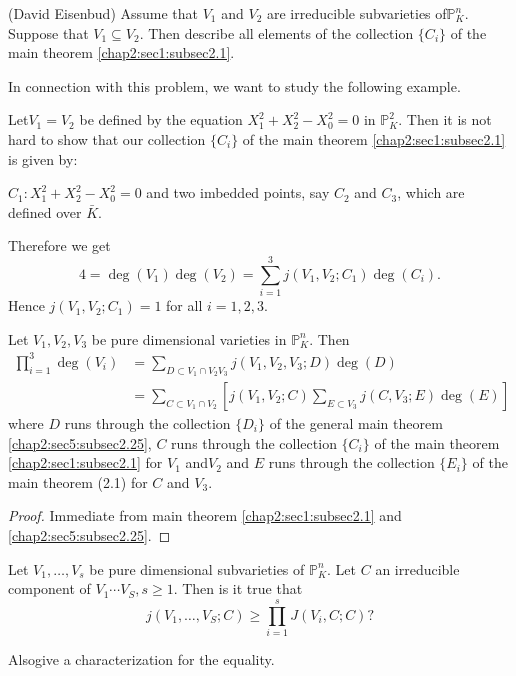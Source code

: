 \begin{numproblem}[9](David Eisenbud)\label{chap3:sec3:prob3.44}
  Assume that $V_1$ and $V_2$ are irreducible subvarieties
  of$\mathbb{P}_K^n$. Suppose that $V_1 \subseteq V_2$. Then describe
  all elements of the collection $\{ C_i\} $ of the main theorem
  \ref{chap2:sec1:subsec2.1}. 
\end{numproblem}

In connection with this problem, we want to study the following
example. 

\setcounter{example}{44}
\begin{example}\label{chap3:sec3:exp3.45}
  Let\pageoriginale $V_1=V_2$ be defined by the equation $X_1^2 +
  X_2^2-X_0^2 =0$ in 
  $\mathbb{P}_K^2 $. Then it is not hard to show that our collection
  $\{ C_i\}$ of the main theorem \ref{chap2:sec1:subsec2.1} is given by: 

  $C_1: X_1^2 +X_2^2 - X_0^2 =0$ and two imbedded points, say $C_2$
  and $C_3$, which are  defined over $\bar{K}$. 
\end{example}

Therefore we get
$$
4= \deg (V_1) \deg (V_2) = \sum \limits _{i=1}^3 j(V_1, V_2;C_1)\deg
(C_i).
$$
Hence $j(V_1, V_2;C_1) =1$ for all $i=1,2,3$.

\setcounter{proposition}{45}
\begin{proposition}\label{chap3:sec3:prop3.46}
  Let $V_1, V_2, V_3$  be pure dimensional varieties in
  $\mathbb{P}_K^n $.  Then 
  \begin{align*}
    \prod_{i=1}^{3} \deg (V_i) & = \sum_{D \subset V_{1} \cap V_2 V_3}
    j(V_1, V_2,V_3;D) \deg (D)\\ 
    &= \sum_{C \subset V_{1 }\cap V_2} \left[j(V_1, V_2;C) \sum_{E \subset
        V_{3}} j(C,V_3;E) \deg (E) \right] 
  \end{align*}
  where $D$  runs through the collection $\{ D_i\}$
  of the general main theorem \ref{chap2:sec5:subsec2.25}, $C$  runs
  through 
  the collection $\{ C_i\}$  of the main theorem \ref{chap2:sec1:subsec2.1}
  for $V_1$ and$V_2$ and $E$ runs
  through the collection $\{ E_i\}$ of the main theorem
  (2.1) for $C$ and $V_3$. 
\end{proposition}

\begin{proof}
 Immediate from main theorem \ref{chap2:sec1:subsec2.1} and
 \ref{chap2:sec5:subsec2.25}. 
\end{proof}

\setcounter{numproblem}{46}
\begin{numproblem}[10]\label{chap3:sec3:prob3.47} %
  Let $V_1,\ldots, V_s$ be pure dimensional subvarieties of
  $\mathbb{P}_K^n$. Let $C$ an irreducible component of  
  $V_1 \cdots V_S,s \geq 1 $. Then is it true that
  $$
  j(V_1, \ldots,V_S;C) \geq \prod^{s}_{i=1}J(V_i,C;C)?
  $$

  Also\pageoriginale give a characterization for the equality.
\end{numproblem}

